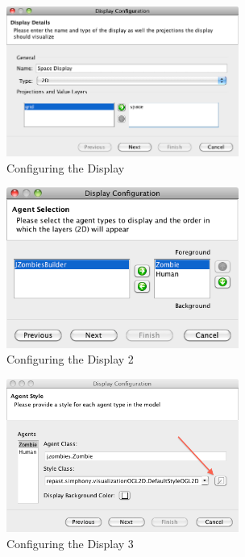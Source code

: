\documentclass[11pt]{amsart}
\begin{document}
\begin{figure}[h]
\begin{center}
\vspace{.2in}
\centerline {
\includegraphics[width=3in]{GettingStartedImages/display1.png}
}
\caption{Configuring the Display}
\label{fig:disp1}
\end{center}
\end{figure}

\begin{figure}[h]
\begin{center}
\vspace{.2in}
\centerline {
\includegraphics[width=3in]{GettingStartedImages/display2.png}
}
\caption{Configuring the Display 2}
\label{fig:disp2}
\end{center}
\end{figure}

\begin{figure}[h]
\begin{center}
\vspace{.2in}
\centerline {
\includegraphics[width=3in]{GettingStartedImages/display3.png}
}
\caption{Configuring the Display 3}
\label{fig:disp3}
\end{center}
\end{figure}
\end{document}
